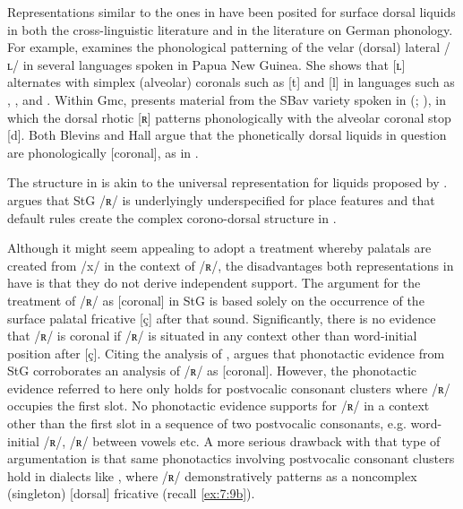 Representations similar to the ones in  have been posited for surface dorsal liquids in both the cross-linguistic literature and in the literature on German phonology. For example, \citet{Blevins1994} examines the phonological patterning of the velar (dorsal) lateral /ʟ/ in several  languages spoken in Papua New Guinea. She shows that [ʟ] alternates with simplex (alveolar) coronals such as [t] and [l] in languages such as , , and . Within Gmc, \citet{Hall2009b} presents material from the SBav variety spoken in  (\citealt{Schatz1897}; ), in which the dorsal rhotic [ʀ] patterns phonologically with the alveolar coronal stop [d]. Both Blevins and Hall argue that the phonetically dorsal liquids in question are phonologically [coronal], as in .

The structure in  is akin to the universal representation for liquids proposed by \citet{WalshDickey1997}. \citet{Glover2014} argues that StG /ʀ/ is underlyingly underspecified for place features and that default rules create the complex co\-ro\-no-dor\-sal structure in .

Although it might seem appealing to adopt a treatment whereby palatals are created from /x/ in the context of /ʀ/, the disadvantages both representations in  have is that they do not derive independent support. The argument for the treatment of /ʀ/ as [coronal] in StG is based solely on the occurrence of the surface palatal fricative [ç] after that sound. Significantly, there is no evidence that  /ʀ/ is coronal if /ʀ/ is situated in any context other than word-initial position after [ç]. Citing the analysis of \citet{Hall1995}, \citet{Glover2014} argues that phonotactic evidence from StG corroborates an analysis of /ʀ/ as [coronal]. However, the phonotactic evidence referred to here only holds for postvocalic consonant clusters where /ʀ/ occupies the first slot. No phonotactic evidence supports  for /ʀ/ in a context other than the first slot in a sequence of two postvocalic consonants, e.g. word-initial /ʀ/, /ʀ/ between vowels etc. A more serious drawback with that type of argumentation is that same phonotactics involving postvocalic consonant clusters hold in dialects like , where /ʀ/ demonstratively patterns as a noncomplex (singleton) [dorsal] fricative (recall \ref{ex:7:9b}).

